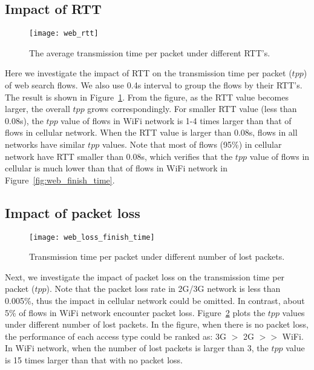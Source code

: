 \subsection{Impact of RTT}

\begin{figure}[th]
\centering
\texttt{[image: web\_rtt]}
\caption{The average transmission time per packet under different RTT's.}
\label{fig:web_rtt}
\end{figure}

Here we investigate the impact of RTT on the transmission time per packet ($tpp$) of web search flows. We also use 0.4s interval to group the flows by their RTT's. The result is shown in Figure~\ref{fig:web_rtt}. From the figure, as the RTT value becomes larger, the overall $tpp$ grows correspondingly. For smaller RTT value (less than 0.08s), the $tpp$ value of flows in WiFi network is 1-4 times larger than that of flows in cellular network. When the RTT value is larger than 0.08s, flows in all networks have similar $tpp$ values. Note that most of flows (95\%) in cellular network have RTT smaller than 0.08s, which verifies that the $tpp$ value of flows in cellular is much lower than that of flows in WiFi network in Figure~\ref{fig:web_finish_time}.

\subsection{Impact of packet loss}
\label{sec:web_pkt_loss}

\begin{figure}[th]
\centering
\texttt{[image: web\_loss\_finish\_time]}
\caption{Transmission time per packet under different number of lost packets.}
\label{fig:web_loss_finish_time}
\end{figure}

Next, we investigate the impact of packet loss on the transmission time per packet ($tpp$). Note that the packet loss rate in 2G/3G network is less than 0.005\%, thus the impact in cellular network could be omitted. In contrast, about 5\% of flows in WiFi network encounter packet loss. Figure~\ref{fig:web_loss_finish_time} plots the $tpp$ values under different number of lost packets. In the figure, when there is no packet loss, the performance of each access type could be ranked as: 3G $>$ 2G $>>$ WiFi. In WiFi network, when the number of lost packets is larger than 3, the $tpp$ value is 15 times larger than that with no packet loss.

